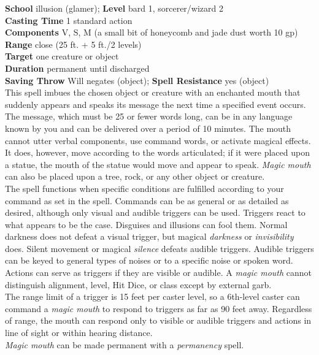 \textbf{School} illusion (glamer); \textbf{Level} bard 1, sorcerer/wizard 2\\
\textbf{Casting Time} 1 standard action\\
\textbf{Components} V, S, M (a small bit of honeycomb and jade dust worth 10 gp)\\
\textbf{Range} close (25 ft. + 5 ft./2 levels)\\
\textbf{Target} one creature or object\\
\textbf{Duration} permanent until discharged\\
\textbf{Saving Throw }Will negates (object); \textbf{Spell Resistance} yes (object)\\
This spell imbues the chosen object or creature with an enchanted mouth that suddenly appears and speaks its message the next time a specified event occurs. The message, which must be 25 or fewer words long, can be in any language known by you and can be delivered over a period of 10 minutes. The mouth cannot utter verbal components, use command words, or activate magical effects. It does, however, move according to the words articulated; if it were placed upon a statue, the mouth of the statue would move and appear to speak. \textit{Magic mouth }can also be placed upon a tree, rock, or any other object or creature.\\
The spell functions when specific conditions are fulfilled according to your command as set in the spell. Commands can be as general or as detailed as desired, although only visual and audible triggers can be used. Triggers react to what appears to be the case. Disguises and illusions can fool them. Normal darkness does not defeat a visual trigger, but magical \textit{darkness }or \textit{invisibility }does. Silent movement or magical \textit{silence }defeats audible triggers. Audible triggers can be keyed to general types of noises or to a specific noise or spoken word. Actions can serve as triggers if they are visible or audible. A \textit{magic mouth }cannot distinguish alignment, level, Hit Dice, or class except by external garb.\\
The range limit of a trigger is 15 feet per caster level, so a 6th-level caster can command a \textit{magic mouth }to respond to triggers as far as 90 feet away. Regardless of range, the mouth can respond only to visible or audible triggers and actions in line of sight or within hearing distance.\\
\textit{Magic mouth }can be made permanent with a \textit{permanency }spell.\\
